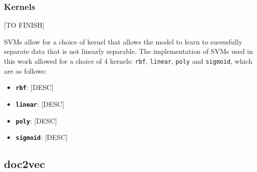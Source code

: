 \documentclass[twocolumn]{article}
\begin{document}
\subsubsection{Kernels}

[TO FINISH]

SVMs allow for a choice of kernel that allows the model to learn to sucessfully separate data that is not linearly separable. The implementation of SVMs used in this work allowed for a choice of 4 kernels: \texttt{rbf}, \texttt{linear}, \texttt{poly} and \texttt{sigmoid}, which are as follows:

\begin{itemize}
	\item \textbf{\texttt{rbf}}: [DESC]
	\item \textbf{\texttt{linear}}: [DESC]
	\item \textbf{\texttt{poly}}: [DESC]
	\item \textbf{\texttt{sigmoid}}: [DESC]
\end{itemize}



\subsection{doc2vec}
\end{document}
